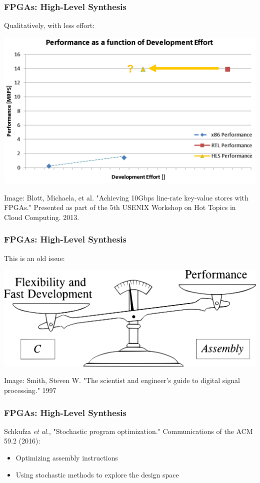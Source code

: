 \documentclass[10pt, compress, xcolor={table,xcdraw,usenames}, aspectratio=169]{beamer}
\begin{document}
\begin{frame}
    \frametitle{FPGAs: High-Level Synthesis}
    \begin{block}{\alert{Qualitatively}, with \alert{less effort}:}
    \begin{center}
        \includegraphics[width=.7\textwidth]{hls_loweffort}

        \scriptsize{Image: Blott, Michaela, et al. "Achieving 10Gbps line-rate
        key-value stores with FPGAs." Presented as part of the 5th USENIX
        Workshop on Hot Topics in Cloud Computing. 2013.}
    \end{center}
    \end{block}
\end{frame}

\begin{frame}
    \frametitle{FPGAs: High-Level Synthesis}
    \begin{block}{This is an \alert{old issue}:}
    \begin{center}
        \includegraphics[width=.74\textwidth]{tradeoff_software}

        \scriptsize{Image: Smith, Steven W. "The scientist and engineer's guide
        to digital signal processing." 1997}
    \end{center}
    \end{block}
\end{frame}

\begin{frame}
    \frametitle{FPGAs: High-Level Synthesis}
    \alert{Schkufza \emph{et al.}}, "Stochastic program optimization."
    Communications of the ACM 59.2 (2016):
    
    \begin{itemize}
        \item Optimizing \alert{assembly instructions}
        \item Using \alert{stochastic methods} to \alert{explore the design space}
    \end{itemize}
\end{frame}
\end{document}

